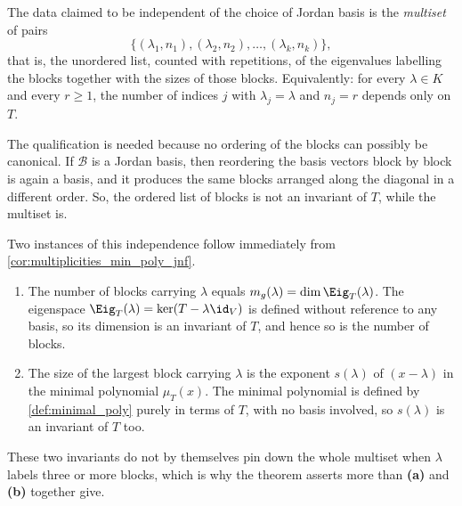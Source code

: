 \begin{exercisesolution}
\label{sol:jnf_uniqueness_meaning}
The data claimed to be independent of the choice of Jordan basis is the \emph{multiset} of pairs
\[ \{ (\lambda_1, n_1), (\lambda_2, n_2), \dots, (\lambda_k, n_k) \}, \]
that is, the unordered list, counted with repetitions, of the eigenvalues labelling the blocks together with the sizes of those blocks. Equivalently: for every $\lambda \in K$ and every $r \ge 1$, the number of indices $j$ with $\lambda_j = \lambda$ and $n_j = r$ depends only on $T$.

The qualification  is needed because no ordering of the blocks can possibly be canonical. If $\mathcal{B}$ is a Jordan basis, then reordering the basis vectors block by block is again a basis, and it produces the same blocks arranged along the diagonal in a different order. So, the ordered list of blocks is not an invariant of $T$, while the multiset is.

Two instances of this independence follow immediately from \cref{cor:multiplicities_min_poly_jnf}.
\begin{enumerate}[label=\textbf{(\alph*)}]
    \item The number of blocks carrying $\lambda$ equals $m_g(\lambda) = \dim \Eig_T(\lambda)$. The eigenspace $\Eig_T(\lambda) = \ker(T - \lambda \id_V)$ is defined without reference to any basis, so its dimension is an invariant of $T$, and hence so is the number of blocks.
    \item The size of the largest block carrying $\lambda$ is the exponent $s(\lambda)$ of $(x - \lambda)$ in the minimal polynomial $\mu_T(x)$. The minimal polynomial is defined by \cref{def:minimal_poly} purely in terms of $T$, with no basis involved, so $s(\lambda)$ is an invariant of $T$ too.
\end{enumerate}
These two invariants do not by themselves pin down the whole multiset when $\lambda$ labels three or more blocks, which is why the theorem asserts more than \textbf{(a)} and \textbf{(b)} together give.
\end{exercisesolution}

